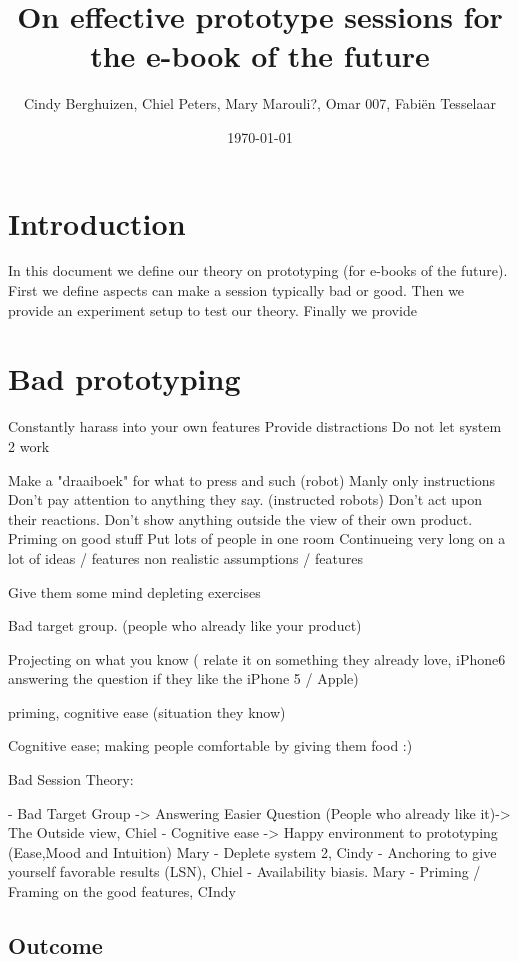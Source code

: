 \documentclass{article}
\title{On effective prototype sessions for the e-book of the future}
\author{Cindy Berghuizen, Chiel Peters, Mary Marouli?, Omar 007, Fabi\"en Tesselaar}
\date{\today}
\begin{document}
\maketitle

\tableofcontents

\section{Introduction}

In this document we define our theory on prototyping (for e-books of the future).
First we define aspects can make a session typically bad or good. 
Then we provide an experiment setup to test our theory. Finally we provide 

\section{Bad prototyping}

Constantly harass into your own features
Provide distractions
Do not let system 2 work

Make a "draaiboek" for what to press and such (robot)
Manly only instructions
Don't pay attention to anything they say. (instructed robots)
Don't act upon their reactions.
Don't show anything outside the view of their own product.
Priming on good stuff
Put lots of people in one room
Continueing very long on a lot of ideas / features
non realistic assumptions / features

Give them some mind depleting exercises

Bad target group. (people who already like your product)

Projecting on what you know ( relate it on something they already love, iPhone6 answering the question if they
like the iPhone 5 / Apple)

priming, cognitive ease (situation they know)

Cognitive ease; making people comfortable by giving them food :)


Bad Session Theory:

- Bad Target Group -> Answering Easier Question (People who already like it)-> The Outside view, Chiel
- Cognitive ease -> Happy environment to prototyping (Ease,Mood and Intuition) Mary
- Deplete system 2, Cindy
- Anchoring to give yourself favorable results (LSN), Chiel
- Availability biasis. Mary
- Priming / Framing on the good features, CIndy

\subsection{Outcome}
\end{document}
